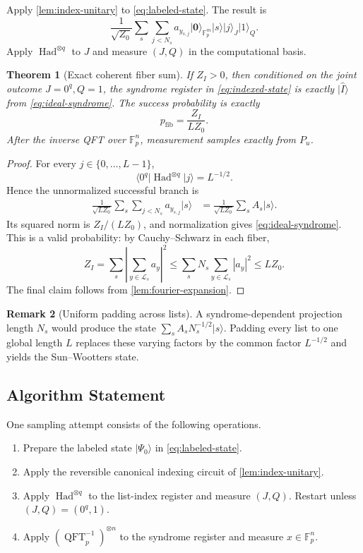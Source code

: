 \documentclass[11pt,letterpaper]{article}
\newtheorem{theorem}{Theorem}[section]
\theoremstyle{definition}
\newtheorem{remark}[theorem]{Remark}
\newcommand{\F}{\mathbb{F}}
\newcommand{\Lcal}{\mathcal{L}}
\newcommand{\ket}[1]{\lvert #1\rangle}
\newcommand{\abs}[1]{\left\lvert #1\right\rvert}
\newcommand{\QFT}{\operatorname{QFT}}
\newcommand{\Had}{\operatorname{Had}}
\begin{document}
Apply \cref{lem:index-unitary} to \cref{eq:labeled-state}.  The result is
\begin{equation}
   \frac1{\sqrt{Z_0}}
   \sum_s\sum_{j<N_s}a_{y_{s,j}}\ket{\mathbf 0}_{\F_p^m}\ket{s}\ket{j}_J\ket1_Q.
   \label{eq:indexed-state}
\end{equation}
Apply $\Had^{\otimes q}$ to $J$ and measure $(J,Q)$ in the computational basis.

\begin{theorem}[Exact coherent fiber sum]
\label{thm:exact-fiber-sum}
If $Z_I>0$, then conditioned on the joint outcome $J=0^q,Q=1$, the syndrome register in \cref{eq:indexed-state} is exactly $\ket{\widehat I}$ from \cref{eq:ideal-syndrome}.  The success probability is exactly
\begin{equation}
   p_{\mathrm{fib}}=\frac{Z_I}{LZ_0}.
   \label{eq:success-exact}
\end{equation}
After the inverse QFT over $\F_p^n$, measurement samples exactly from $P_u$.
\end{theorem}

\begin{proof}
For every $j\in\{0,\ldots,L-1\}$,
\[
   \langle0^q\vert \Had^{\otimes q}\vert j\rangle=L^{-1/2}.
\]
Hence the unnormalized successful branch is
\begin{align*}
   \frac1{\sqrt{LZ_0}}\sum_s\sum_{j<N_s}a_{y_{s,j}}\ket{s}
   &=\frac1{\sqrt{LZ_0}}\sum_sA_s\ket{s}.
\end{align*}
Its squared norm is $Z_I/(LZ_0)$, and normalization gives \cref{eq:ideal-syndrome}.  This is a valid probability: by Cauchy--Schwarz in each fiber,
\[
   Z_I=\sum_s\abs{\sum_{y\in\Lcal_s}a_y}^2
      \le\sum_sN_s\sum_{y\in\Lcal_s}\abs{a_y}^2
      \le LZ_0.
\]
The final claim follows from \cref{lem:fourier-expansion}.
\end{proof}

\begin{remark}[Uniform padding across lists]
A syndrome-dependent projection length $N_s$ would produce the state
$\sum_s A_sN_s^{-1/2}\ket{s}$.  Padding every list to one global length $L$ replaces these varying factors by the common factor $L^{-1/2}$ and yields the Sun--Wootters state.
\end{remark}

\subsection{Algorithm Statement}

One sampling attempt consists of the following operations.
\begin{enumerate}[label=\textbf{\arabic*.},leftmargin=2.2em]
  \item Prepare the labeled state $\ket{\Psi_0}$ in \cref{eq:labeled-state}.
  \item Apply the reversible canonical indexing circuit of \cref{lem:index-unitary}.
  \item Apply $\Had^{\otimes q}$ to the list-index register and measure $(J,Q)$.  Restart unless $(J,Q)=(0^q,1)$.
  \item Apply $(\QFT_p^{-1})^{\otimes n}$ to the syndrome register and measure $x\in\F_p^n$.
\end{enumerate}
\end{document}
